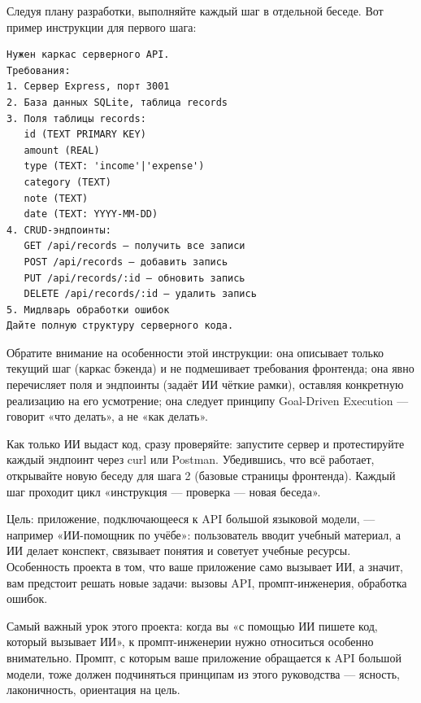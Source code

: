 
Следуя плану разработки, выполняйте каждый шаг в отдельной беседе. Вот пример инструкции для первого шага:

\begin{lstlisting}
Нужен каркас серверного API.
Требования:
1. Сервер Express, порт 3001
2. База данных SQLite, таблица records
3. Поля таблицы records:
   id (TEXT PRIMARY KEY)
   amount (REAL)
   type (TEXT: 'income'|'expense')
   category (TEXT)
   note (TEXT)
   date (TEXT: YYYY-MM-DD)
4. CRUD-эндпоинты:
   GET /api/records — получить все записи
   POST /api/records — добавить запись
   PUT /api/records/:id — обновить запись
   DELETE /api/records/:id — удалить запись
5. Мидлварь обработки ошибок
Дайте полную структуру серверного кода.
\end{lstlisting}

Обратите внимание на особенности этой инструкции: она описывает только текущий шаг (каркас бэкенда) и не подмешивает требования фронтенда; она явно перечисляет поля и эндпоинты (задаёт ИИ чёткие рамки), оставляя конкретную реализацию на его усмотрение; она следует принципу Goal-Driven Execution — говорит «что делать», а не «как делать».

Как только ИИ выдаст код, сразу проверяйте: запустите сервер и протестируйте каждый эндпоинт через curl или Postman. Убедившись, что всё работает, открывайте новую беседу для шага 2 (базовые страницы фронтенда). Каждый шаг проходит цикл «инструкция — проверка — новая беседа».



Цель: приложение, подключающееся к API большой языковой модели, — например «ИИ-помощник по учёбе»: пользователь вводит учебный материал, а ИИ делает конспект, связывает понятия и советует учебные ресурсы. Особенность проекта в том, что ваше приложение само вызывает ИИ, а значит, вам предстоит решать новые задачи: вызовы API, промпт-инженерия, обработка ошибок.

Самый важный урок этого проекта: когда вы «с помощью ИИ пишете код, который вызывает ИИ», к промпт-инженерии нужно относиться особенно внимательно. Промпт, с которым ваше приложение обращается к API большой модели, тоже должен подчиняться принципам из этого руководства — ясность, лаконичность, ориентация на цель.


